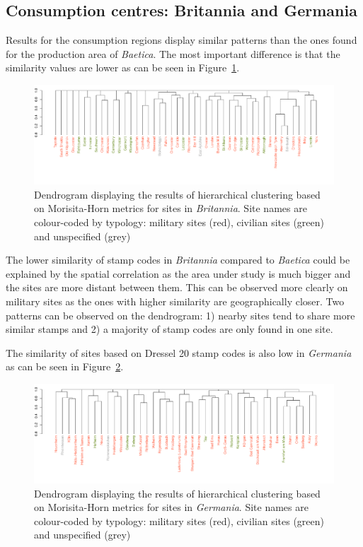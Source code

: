 \subsection{Consumption centres: Britannia and Germania}
\label{sec:6}

Results for the consumption regions display similar patterns than the ones found for the production area of \textit{Baetica}. The most important difference is that the similarity values are lower as can be seen in Figure~\ref{britmap}.


\begin{figure}[htp]
	\centering
\includegraphics[angle=270,
width=0.7\linewidth]{dendrobrit5.pdf}
\caption{Dendrogram displaying the results of hierarchical clustering based on Morisita-Horn metrics for sites in \textit{Britannia}. Site names are colour-coded by typology: military sites (red), civilian sites (green) and unspecified (grey)}
\label{britmap}
\end{figure}

The lower similarity of stamp codes in \textit{Britannia} compared to \textit{Baetica} could be explained by the spatial correlation as the area under study is much bigger and the sites are more distant between them. This can be observed more clearly on military sites as the ones with higher similarity are geographically closer. Two patterns can be observed on the dendrogram: 1) nearby sites tend to share more similar stamps and 2) a majority of stamp codes are only found in one site.
 
The similarity of sites based on Dressel 20 stamp codes is also low in \textit{Germania} as can be seen in Figure~\ref{germap}. 

\begin{figure}
	\centering
\includegraphics[angle=270, width=0.7\linewidth]{dendroger5.pdf}
\caption{Dendrogram displaying the results of hierarchical clustering based on Morisita-Horn metrics for sites in \textit{Germania}. Site names are colour-coded by typology: military sites (red), civilian sites (green) and unspecified (grey)}
\label{germap}
\end{figure}

